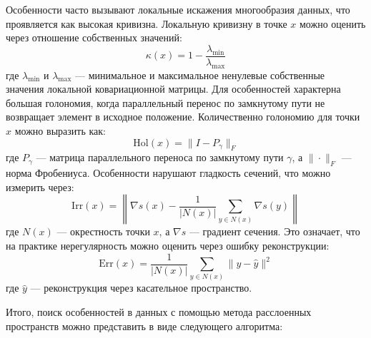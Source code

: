 \documentclass[a4paper,12pt]{extarticle}
\begin{document}
Особенности часто вызывают локальные искажения многообразия данных, что проявляется как высокая кривизна. Локальную кривизну в точке $x$ можно оценить через отношение собственных значений:
\begin{equation}
\kappa(x) = 1 - \frac{\lambda_{\min}}{\lambda_{\max}}
\end{equation}
где $\lambda_{\min}$ и $\lambda_{\max}$ — минимальное и максимальное ненулевые собственные значения локальной ковариационной матрицы. Для особенностей характерна большая голономия, когда параллельный перенос по замкнутому пути не возвращает элемент в исходное положение. Количественно голономию для точки $x$ можно выразить как:
\begin{equation}
\text{Hol}(x) = \|I - P_{\gamma}\|_F
\end{equation}
где $P_{\gamma}$ — матрица параллельного переноса по замкнутому пути $\gamma$, а $\|\cdot\|_F$ — норма Фробениуса. Особенности нарушают гладкость сечений, что можно измерить через:
\begin{equation}
\text{Irr}(x) = \left\|\nabla s(x) - \frac{1}{|N(x)|}\sum_{y \in N(x)}\nabla s(y)\right\|
\end{equation}
где $N(x)$ — окрестность точки $x$, а $\nabla s$ — градиент сечения. Это означает, что на практике нерегулярность можно оценить через ошибку реконструкции:
\begin{equation}
\text{Err}(x) = \frac{1}{|N(x)|}\sum_{y \in N(x)}\|y - \hat{y}\|^2
\end{equation}
где $\hat{y}$ — реконструкция через касательное пространство.

Итого, поиск особенностей в данных с помощью метода расслоенных пространств можно представить в виде следующего алгоритма:
\end{document}
